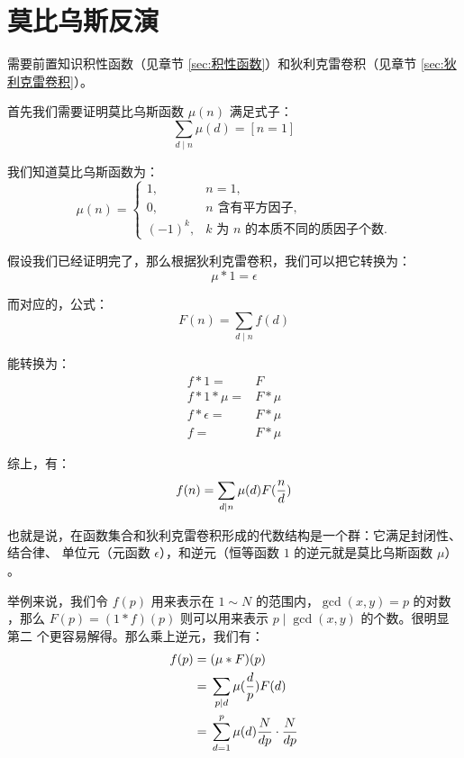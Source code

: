 \section{莫比乌斯反演}
\label{sec:莫比乌斯反演}



需要前置知识积性函数（见章节 \ref{sec:积性函数}）和狄利克雷卷积（见章节
\ref{sec:狄利克雷卷积}）。

首先我们需要证明莫比乌斯函数 $\mu(n)$ 满足式子：\[
    \sum_{d \mid n} \mu(d) = [n = 1]
\]

我们知道莫比乌斯函数为：\[
    \mu(n) = \begin{cases}
        1,      & n = 1, \\
        0,      & n \text{ 含有平方因子}, \\
        (-1)^k, & k \text{ 为 } n \text{ 的本质不同的质因子个数}.
    \end{cases}
\]

假设我们已经证明完了，那么根据狄利克雷卷积，我们可以把它转换为：\[
    \mu * 1 = \epsilon
\]

而对应的，公式：\[
    F(n) = \sum_{d \mid n} f(d)
\]

能转换为：\begin{align*}
    f * 1        = {} & F \\
    f * 1 * \mu  = {} & F * \mu \\
    f * \epsilon = {} & F * \mu \\
    f            = {} & F * \mu
\end{align*}

综上，有：\[
    f(n) = \sum_{d \mid n} \mu(d) F({n \over d})
\]

也就是说，在函数集合和狄利克雷卷积形成的代数结构是一个群：它满足封闭性、结合律、
单位元（元函数 $\epsilon$），和逆元（恒等函数 $1$ 的逆元就是莫比乌斯函数 $\mu$）
。

举例来说，我们令 $f(p)$ 用来表示在 $1 \sim N$ 的范围内，$\gcd(x, y) = p$ 的对数
，那么 $F(p) = (1 * f)(p)$ 则可以用来表示 $p \mid \gcd(x, y)$ 的个数。很明显第二
个更容易解得。那么乘上逆元，我们有：\begin{align*}
    f(p) = {} & (\mu * F)(p) \\
         = {} & \sum_{p \mid d} \mu({d \over p}) F(d) \\
         = {} & \sum_{d = 1}^{p} \mu(d){N \over dp}\cdot{N \over dp}
\end{align*}



